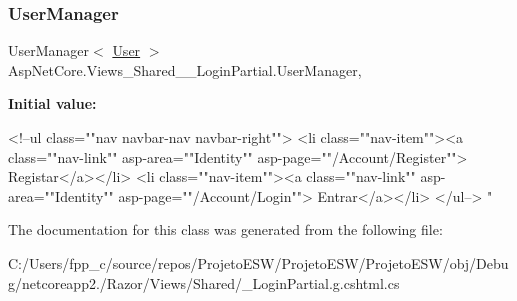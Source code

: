 \subsubsection{\texorpdfstring{User\+Manager}{UserManager}}
{\footnotesize\ttfamily User\+Manager$<$ \mbox{\hyperlink{class_projeto_e_s_w_1_1_models_1_1_user}{User}} $>$ Asp\+Net\+Core.\+Views\+\_\+\+Shared\+\_\+\+\_\+\+Login\+Partial.\+User\+Manager\hspace{0.3cm}{\ttfamily [get]}, {}}

{\bfseries Initial value\+:}
\begin{DoxyCode}
    <!--ul \textcolor{keyword}{class}=\textcolor{stringliteral}{""}nav navbar-nav navbar-right\textcolor{stringliteral}{""}>
        <li \textcolor{keyword}{class}=\textcolor{stringliteral}{""}nav-item\textcolor{stringliteral}{""}><a \textcolor{keyword}{class}=\textcolor{stringliteral}{""}nav-link\textcolor{stringliteral}{""} asp-area=\textcolor{stringliteral}{""}Identity\textcolor{stringliteral}{""} asp-page=\textcolor{stringliteral}{""}/Account/Register\textcolor{stringliteral}{""}>
      Registar</a></li>
        <li \textcolor{keyword}{class}=\textcolor{stringliteral}{""}nav-item\textcolor{stringliteral}{""}><a \textcolor{keyword}{class}=\textcolor{stringliteral}{""}nav-link\textcolor{stringliteral}{""} asp-area=\textcolor{stringliteral}{""}Identity\textcolor{stringliteral}{""} asp-page=\textcolor{stringliteral}{""}/Account/Login\textcolor{stringliteral}{""}>
      Entrar</a></li>
    </ul-->
\textcolor{stringliteral}{"}
\end{DoxyCode}


The documentation for this class was generated from the following file\+:\begin{DoxyCompactItemize}
\item 
C\+:/\+Users/fpp\+\_\+c/source/repos/\+Projeto\+E\+S\+W/\+Projeto\+E\+S\+W/\+Projeto\+E\+S\+W/obj/\+Debug/netcoreapp2./\+Razor/\+Views/\+Shared/\+\_\+\+Login\+Partial.\+g.\+cshtml.\+cs\end{DoxyCompactItemize}
